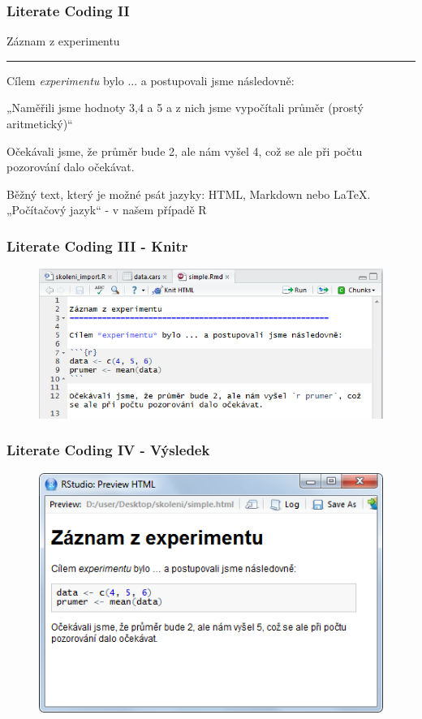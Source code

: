 \documentclass[10pt,xcolor={dvipsnames}]{beamer}
\begin{document}
\begin{frame}
\frametitle{Literate Coding II}
\textcolor{NavyBlue}{\Large{Záznam z experimentu}}\hrule\bigskip 

\textcolor{NavyBlue}{Cílem \emph{experimentu} bylo ...\newline
a postupovali jsme následovně:\newline}

\textcolor{WildStrawberry}{„Naměřili jsme hodnoty 3,4 a 5 a z nich jsme vypočítali průměr (prostý aritmetický)“} \newline\smallskip

\textcolor{NavyBlue}{Očekávali jsme, že průměr bude 2, ale nám vyšel} \textcolor{WildStrawberry}{4}, \textcolor{NavyBlue}{což se ale při počtu pozorování dalo očekávat.}\bigskip

\textcolor{NavyBlue}{Běžný text, který je možné psát jazyky: HTML, Markdown nebo \LaTeX.} \newline
\textcolor{WildStrawberry}{„Počítačový jazyk“ - v našem případě R}
\end{frame}

\begin{frame}
\frametitle{Literate Coding III - Knitr}
\begin{figure}
\includegraphics[scale=0.7]{rmarkdown}
\end{figure}
\end{frame}

\begin{frame}
\frametitle{Literate Coding IV - Výsledek}
\begin{figure}
\includegraphics[scale=0.8]{vysledek}
\end{figure}
\end{frame}
\end{document}
